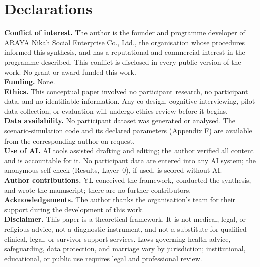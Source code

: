 \documentclass[10pt,twocolumn]{article}
\begin{document}
\section*{Declarations}
\footnotesize
\textbf{Conflict of interest.} The author is the founder and programme developer of ARAYA Nikah Social Enterprise Co., Ltd., the organisation whose procedures informed this synthesis, and has a reputational and commercial interest in the programme described. This conflict is disclosed in every public version of the work. No grant or award funded this work.\\
\textbf{Funding.} None.\\
\textbf{Ethics.} This conceptual paper involved no participant research, no participant data, and no identifiable information. Any co-design, cognitive interviewing, pilot data collection, or evaluation will undergo ethics review before it begins.\\
\textbf{Data availability.} No participant dataset was generated or analysed. The scenario-simulation code and its declared parameters (Appendix F) are available from the corresponding author on request.\\
\textbf{Use of AI.} AI tools assisted drafting and editing; the author verified all content and is accountable for it. No participant data are entered into any AI system; the anonymous self-check (Results, Layer~0), if used, is scored without AI.\\
\textbf{Author contributions.} YL conceived the framework, conducted the synthesis, and wrote the manuscript; there are no further contributors.\\
\textbf{Acknowledgements.} The author thanks the organisation's team for their support during the development of this work.\\
\textbf{Disclaimer.} This paper is a theoretical framework. It is not medical, legal, or religious advice, not a diagnostic instrument, and not a substitute for qualified clinical, legal, or survivor-support services. Laws governing health advice, safeguarding, data protection, and marriage vary by jurisdiction; institutional, educational, or public use requires legal and professional review.

\balance


\onecolumn
\appendix
\end{document}
